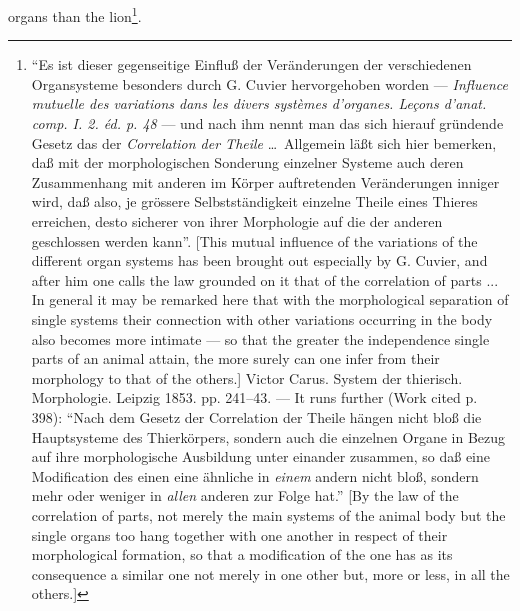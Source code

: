 \documentclass[12pt,a4paper]{book}
\begin{document}
organs than the lion\footnote{``Es ist dieser gegenseitige Einfluß der Veränderungen
der verschiedenen Organsysteme besonders durch G. Cuvier hervorgehoben worden ---
\textit{Influence mutuelle des variations dans les divers systèmes d'organes. Leçons
d'anat. comp. I. 2. éd. p. 48} --- und nach ihm nennt man das sich hierauf gründende
Gesetz das der \emph{Correlation der Theile} \dots\ Allgemein läßt sich hier bemerken,
daß mit der morphologischen Sonderung einzelner Systeme auch deren Zusammenhang mit
anderen im Körper auftretenden Veränderungen inniger wird, daß also, je grössere
Selbstständigkeit einzelne Theile eines Thieres erreichen, desto sicherer von ihrer
Morphologie auf die der anderen geschlossen werden kann''. [This mutual influence of
the variations of the different organ systems has been brought out especially by
G. Cuvier, and after him one calls the law grounded on it that of the correlation of
parts ... In general it may be remarked here that with the morphological separation of
single systems their connection with other variations occurring in the body also
becomes more intimate --- so that the greater the independence single parts of an
animal attain, the more surely can one infer from their morphology to that of the
others.] Victor Carus. System der thierisch. Morphologie. Leipzig 1853. pp. 241--43.
--- It runs further (Work cited p. 398): ``Nach dem Gesetz der Correlation der Theile
hängen nicht bloß die Hauptsysteme des Thierkörpers, sondern auch die einzelnen Organe
in Bezug auf ihre morphologische Ausbildung unter einander zusammen, so daß eine
Modification des einen eine ähnliche in \emph{einem} andern nicht bloß, sondern mehr
oder weniger in \emph{allen} anderen zur Folge hat.'' [By the law of the correlation of
parts, not merely the main systems of the animal body but the single organs too hang
together with one another in respect of their morphological formation, so that a
modification of the one has as its consequence a similar one not merely in one other
but, more or less, in all the others.]}.
\end{document}
